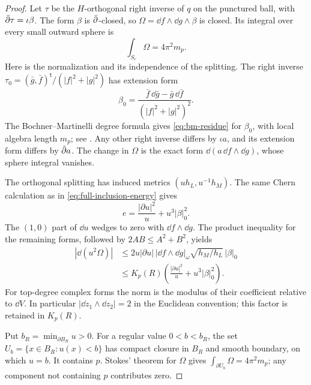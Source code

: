 \begin{proof}
Let $\tau$ be the $H$-orthogonal right inverse of $q$ on the
punctured ball, with $\bar\partial\tau=\iota\beta$. The form $\beta$
is $\bar\partial$-closed, so
$\Omega=\dd f\wedge\dd g\wedge\beta$ is closed.
Its integral over every small outward sphere is
\begin{equation}\label{eq:bm-residue}
                  \int_{S_r}\Omega=4\pi^2m_p .
\end{equation}
Here is the normalization and its independence of the
splitting. The right inverse
$\tau_0=(\bar g,\bar f)^{\mathsf t}/(|f|^2+|g|^2)$
has extension form
\[
 \beta_0=\frac{\bar f\,\dd\bar g-\bar g\,\dd\bar f}
                       {(|f|^2+|g|^2)^2}.
\]
The Bochner--Martinelli degree formula gives
\eqref{eq:bm-residue} for $\beta_0$, with local algebra
length $m_p$; see
\cite[Chapter~II, Section~5, Example~5.5; Chapter~IV,
Section~2, Theorems~2.3--2.4]{Suwa05}.
Any other right inverse differs by $\iota a$, and its
extension form differs by $\bar\partial a$. The change in $\Omega$
is the exact form $\dd(a\,\dd f\wedge\dd g)$, whose
sphere integral vanishes.

The orthogonal splitting has induced metrics
$(uh_L,u^{-1}h_M)$. The same Chern calculation as in
\eqref{eq:full-inclusion-energy} gives
\[
                    e=\frac{|\partial u|^2}{u}
                                      +u^3|\beta|_0^2.
\]
The $(1,0)$ part of $\dd u$ wedges to zero with
$\dd f\wedge\dd g$. The product inequality for the remaining
forms, followed by $2AB\le A^2+B^2$, yields
\begin{equation}\label{eq:weighted-residue-form}
 \begin{split}
 |\dd(u^2\Omega)|
 &\le2u|\partial u|\,|\dd f\wedge\dd g|_\omega
                                  \sqrt{h_M/h_L}\,|\beta|_0\\
 &\le K_p(R)
             \left(\frac{|\partial u|^2}{u}+u^3|\beta|_0^2\right).
 \end{split}
\end{equation}
For top-degree complex forms the norm is the modulus of
their coefficient relative to $\dd V$.
In particular $|\dd z_1\wedge\dd z_2|=2$ in the
Euclidean convention; this factor is retained in $K_p(R)$.

Put $b_R=\min_{\partial B_R}u>0$. For a regular value
$0<b<b_R$, the set $U_b=\{x\in B_R:u(x)<b\}$ has compact
closure in $B_R$ and smooth boundary, on which $u=b$.
It contains $p$. Stokes' theorem for $\Omega$ gives
$\int_{\partial U_b}\Omega=4\pi^2m_p$; any component
not containing $p$ contributes zero.


\end{proof}
